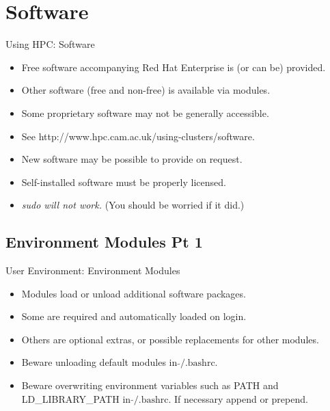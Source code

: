 \section{Software}
\begin{frame}{Using HPC: Software}
\begin{itemize}
\item{Free software accompanying \alert{Red Hat Enterprise} is (or can be) provided.}
\item{Other software (free and non-free) is available via \alert{modules}.}
\item{Some proprietary software may not be generally accessible.}
\item{See \alert{http://www.hpc.cam.ac.uk/using-clusters/software}.}
\item{New software may be possible to provide on request.}
\item{\alert{Self-installed software must be properly licensed.}}
  \pause
\item{\color{red}\emph{sudo will not work.}\/ (You should be worried if it did.)}
\end{itemize}
\end{frame}

\subsection{Environment Modules Pt 1}
\begin{frame}[fragile]{User Environment: Environment Modules}
\begin{itemize}
\item{Modules load or unload additional software packages.}
\item{Some are \alert{required} and automatically loaded on login.}
\item{Others are optional extras, or possible replacements for other modules.}
\item{\alert{Beware} unloading default modules in $\tilde{}\text{/.bashrc}$.}
\item{\alert{Beware} overwriting environment variables such as PATH and LD\_LIBRARY\_PATH in $\tilde{}\text{/.bashrc}$. If necessary append or prepend.}
\end{itemize}
\end{frame}

